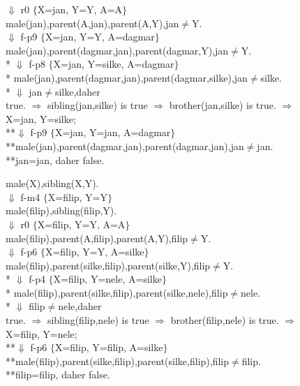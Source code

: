 \documentclass[a4paper, dvipsnames]{article}
\begin{document}
{{ $\Downarrow$ r0 $\lbrace$X=jan, Y=Y, A=A$\rbrace$\\
 male(jan),parent(A,jan),parent(A,Y),jan$\neq$Y. \\
 $\Downarrow$ f-p9 $\lbrace$X=jan, Y=Y, A=dagmar$\rbrace$\\
 male(jan),parent(dagmar,jan),parent(dagmar,Y),jan$\neq$Y. \\
* $\Downarrow$ f-p8 $\lbrace$X=jan, Y=silke, A=dagmar$\rbrace$\\
* male(jan),parent(dagmar,jan),parent(dagmar,silke),jan$\neq$silke. \\
* $\Downarrow$  jan$\neq$silke,daher \\
true. $\Rightarrow$ sibling(jan,silke)  is true $\Rightarrow$ brother(jan,silke) is true. $\Rightarrow$\\
X=jan, Y=silke;\\
**$\Downarrow$ f-p9 $\lbrace$X=jan, Y=jan, A=dagmar$\rbrace$\\
**male(jan),parent(dagmar,jan),parent(dagmar,jan),jan$\neq$jan. \\
**jan=jan, daher false. 
\newpage 
\begin{flushleft}
male(X),sibling(X,Y).\\
 $\Downarrow$ f-m4 $\lbrace$X=filip, Y=Y$\rbrace$\\
 male(filip),sibling(filip,Y).\\
 $\Downarrow$ r0 $\lbrace$X=filip, Y=Y, A=A$\rbrace$\\
 male(filip),parent(A,filip),parent(A,Y),filip$\neq$Y. \\
 $\Downarrow$ f-p6 $\lbrace$X=filip, Y=Y, A=silke$\rbrace$\\
 male(filip),parent(silke,filip),parent(silke,Y),filip$\neq$Y. \\
* $\Downarrow$ f-p4 $\lbrace$X=filip, Y=nele, A=silke$\rbrace$\\
* male(filip),parent(silke,filip),parent(silke,nele),filip$\neq$nele. \\
* $\Downarrow$  filip$\neq$nele,daher \\
true. $\Rightarrow$ sibling(filip,nele)  is true $\Rightarrow$ brother(filip,nele) is true. $\Rightarrow$\\
X=filip, Y=nele;\\
**$\Downarrow$ f-p6 $\lbrace$X=filip, Y=filip, A=silke$\rbrace$\\
**male(filip),parent(silke,filip),parent(silke,filip),filip$\neq$filip. \\
**filip=filip, daher false.
\end{flushleft}
}}
\end{document}
